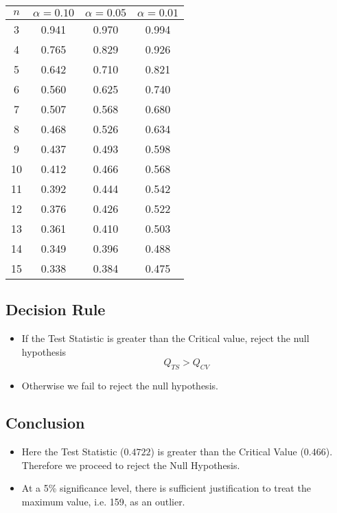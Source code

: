 \documentclass[a4paper,12pt]{article}
\begin{document}
\begin{center}
\begin{tabular}{|c|c|c|c|}
\hline
$n$	&	$\alpha=0.10$	&	$\alpha=0.05$	&	$\alpha=0.01$	\\ \hline
3	&	0.941	&	0.970	&	0.994	\\ \hline
4	&	0.765	&	0.829	&	0.926	\\ \hline
5	&	0.642	&	0.710	&	0.821	\\ \hline
6	&	0.560	&	0.625	&	0.740	\\ \hline
7	&	0.507	&	0.568	&	0.680	\\ \hline
8	&	0.468	&	0.526	&	0.634	\\ \hline
9	&	0.437	&	0.493	&	0.598	\\ \hline
10	&	0.412	&	0.466	&	0.568	\\ \hline
11	&	0.392	&	0.444	&	0.542	\\ \hline
12	&	0.376	&	0.426	&	0.522	\\ \hline
13	&	0.361	&	0.410	&	0.503	\\ \hline
14	&	0.349	&	0.396	&	0.488	\\ \hline
15	&	0.338	&	0.384	&	0.475	\\ \hline

\end{tabular} 
\end{center}

\subsection*{Decision Rule}


\begin{itemize}
    \item 
 If the Test Statistic is greater than the Critical value, reject the null hypothesis
\[ Q_{TS} > Q_{CV}\]

\item  Otherwise we fail to reject the null hypothesis.
\end{itemize}
\subsection*{Conclusion}

\begin{itemize}
\item Here the Test Statistic ($0.4722$) is greater than the Critical Value ($0.466$). Therefore we proceed to reject the Null Hypothesis. 

\item At a 5\% significance level, there is sufficient justification to treat the maximum value, i.e. 159, as an outlier.
\end{itemize}
\end{document}
